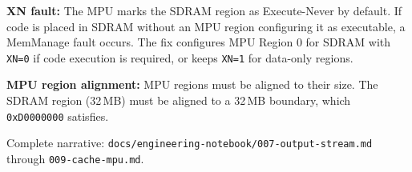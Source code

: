 \textbf{XN fault:} The MPU marks the SDRAM region as Execute-Never by default. If code is placed in SDRAM without an MPU region configuring it as executable, a MemManage fault occurs. The fix configures MPU Region 0 for SDRAM with \texttt{XN=0} if code execution is required, or keeps \texttt{XN=1} for data-only regions.

\textbf{MPU region alignment:} MPU regions must be aligned to their size. The SDRAM region (32\,MB) must be aligned to a 32\,MB boundary, which \texttt{0xD0000000} satisfies.

Complete narrative: \texttt{docs/engineering-notebook/007-output-stream.md} through \texttt{009-cache-mpu.md}.